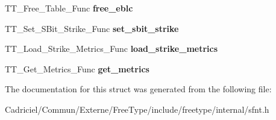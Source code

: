 \begin{DoxyCompactItemize}
\item 
T\+T\+\_\+\+Free\+\_\+\+Table\+\_\+\+Func {\bfseries free\+\_\+eblc}\hypertarget{struct_s_f_n_t___interface___a043a22a8dd45b30dc6e8e5cb7be8dc44}{}\label{struct_s_f_n_t___interface___a043a22a8dd45b30dc6e8e5cb7be8dc44}

\item 
T\+T\+\_\+\+Set\+\_\+\+S\+Bit\+\_\+\+Strike\+\_\+\+Func {\bfseries set\+\_\+sbit\+\_\+strike}\hypertarget{struct_s_f_n_t___interface___ab9e73d79753ea4a492c1cf66aee8e518}{}\label{struct_s_f_n_t___interface___ab9e73d79753ea4a492c1cf66aee8e518}

\item 
T\+T\+\_\+\+Load\+\_\+\+Strike\+\_\+\+Metrics\+\_\+\+Func {\bfseries load\+\_\+strike\+\_\+metrics}\hypertarget{struct_s_f_n_t___interface___a285149d0d4f00f2b862e3db45205cfa0}{}\label{struct_s_f_n_t___interface___a285149d0d4f00f2b862e3db45205cfa0}

\item 
T\+T\+\_\+\+Get\+\_\+\+Metrics\+\_\+\+Func {\bfseries get\+\_\+metrics}\hypertarget{struct_s_f_n_t___interface___a32ceff5842782c1cf7d7992e40cc858e}{}\label{struct_s_f_n_t___interface___a32ceff5842782c1cf7d7992e40cc858e}

\end{DoxyCompactItemize}


The documentation for this struct was generated from the following file\+:\begin{DoxyCompactItemize}
\item 
Cadriciel/\+Commun/\+Externe/\+Free\+Type/include/freetype/internal/sfnt.\+h\end{DoxyCompactItemize}
